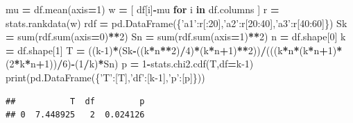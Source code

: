 \documentclass[polish,]{book}
\newenvironment{Shaded}{\begin{snugshade}}{\end{snugshade}}
\newcommand{\BuiltInTok}[1]{#1}
\newcommand{\ControlFlowTok}[1]{\textcolor[rgb]{0.13,0.29,0.53}{\textbf{#1}}}
\newcommand{\DecValTok}[1]{\textcolor[rgb]{0.00,0.00,0.81}{#1}}
\newcommand{\KeywordTok}[1]{\textcolor[rgb]{0.13,0.29,0.53}{\textbf{#1}}}
\newcommand{\NormalTok}[1]{#1}
\newcommand{\OperatorTok}[1]{\textcolor[rgb]{0.81,0.36,0.00}{\textbf{#1}}}
\newcommand{\StringTok}[1]{\textcolor[rgb]{0.31,0.60,0.02}{#1}}
\begin{document}
\begin{Shaded}
\begin{Highlighting}[]
\NormalTok{mu }\OperatorTok{=}\NormalTok{ df.mean(axis}\OperatorTok{=}\DecValTok{1}\NormalTok{)}
\NormalTok{w }\OperatorTok{=}\NormalTok{ [ df[i]}\OperatorTok{-}\NormalTok{mu }\ControlFlowTok{for}\NormalTok{ i }\KeywordTok{in}\NormalTok{ df.columns ]}
\NormalTok{r }\OperatorTok{=}\NormalTok{ stats.rankdata(w)}
\NormalTok{rdf }\OperatorTok{=}\NormalTok{ pd.DataFrame(\{}\StringTok{'a1'}\NormalTok{:r[:}\DecValTok{20}\NormalTok{],}\StringTok{'a2'}\NormalTok{:r[}\DecValTok{20}\NormalTok{:}\DecValTok{40}\NormalTok{],}\StringTok{'a3'}\NormalTok{:r[}\DecValTok{40}\NormalTok{:}\DecValTok{60}\NormalTok{]\})}
\NormalTok{Sk }\OperatorTok{=} \BuiltInTok{sum}\NormalTok{(rdf.}\BuiltInTok{sum}\NormalTok{(axis}\OperatorTok{=}\DecValTok{0}\NormalTok{)}\OperatorTok{**}\DecValTok{2}\NormalTok{)}
\NormalTok{Sn }\OperatorTok{=} \BuiltInTok{sum}\NormalTok{(rdf.}\BuiltInTok{sum}\NormalTok{(axis}\OperatorTok{=}\DecValTok{1}\NormalTok{)}\OperatorTok{**}\DecValTok{2}\NormalTok{)}
\NormalTok{n }\OperatorTok{=}\NormalTok{ df.shape[}\DecValTok{0}\NormalTok{]}
\NormalTok{k }\OperatorTok{=}\NormalTok{ df.shape[}\DecValTok{1}\NormalTok{]}
\NormalTok{T }\OperatorTok{=}\NormalTok{ ((k}\DecValTok{-1}\NormalTok{)}\OperatorTok{*}\NormalTok{(Sk}\OperatorTok{-}\NormalTok{((k}\OperatorTok{*}\NormalTok{n}\OperatorTok{**}\DecValTok{2}\NormalTok{)}\OperatorTok{/}\DecValTok{4}\NormalTok{)}\OperatorTok{*}\NormalTok{(k}\OperatorTok{*}\NormalTok{n}\OperatorTok{+}\DecValTok{1}\NormalTok{)}\OperatorTok{**}\DecValTok{2}\NormalTok{))}\OperatorTok{/}\NormalTok{(((k}\OperatorTok{*}\NormalTok{n}\OperatorTok{*}\NormalTok{(k}\OperatorTok{*}\NormalTok{n}\OperatorTok{+}\DecValTok{1}\NormalTok{)}\OperatorTok{*}\NormalTok{(}\DecValTok{2}\OperatorTok{*}\NormalTok{k}\OperatorTok{*}\NormalTok{n}\OperatorTok{+}\DecValTok{1}\NormalTok{))}\OperatorTok{/}\DecValTok{6}\NormalTok{)}\OperatorTok{-}\NormalTok{(}\DecValTok{1}\OperatorTok{/}\NormalTok{k)}\OperatorTok{*}\NormalTok{Sn)}
\NormalTok{p }\OperatorTok{=} \DecValTok{1}\OperatorTok{-}\NormalTok{stats.chi2.cdf(T,df}\OperatorTok{=}\NormalTok{k}\DecValTok{-1}\NormalTok{)}
\BuiltInTok{print}\NormalTok{(pd.DataFrame(\{}\StringTok{'T'}\NormalTok{:[T],}\StringTok{'df'}\NormalTok{:[k}\DecValTok{-1}\NormalTok{],}\StringTok{'p'}\NormalTok{:[p]\}))}
\end{Highlighting}
\end{Shaded}

\begin{verbatim}
##           T  df         p
## 0  7.448925   2  0.024126
\end{verbatim}
\end{document}
